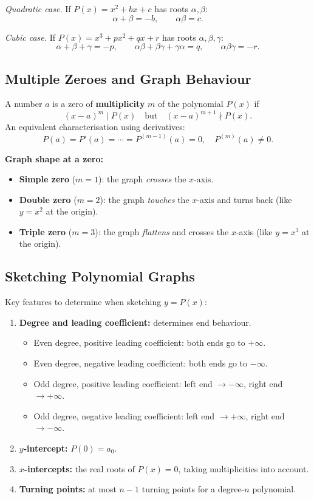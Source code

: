 \documentclass[12pt]{article}
\begin{document}
\textit{Quadratic case.} If $P(x) = x^2 + bx + c$ has roots $\alpha, \beta$:
\[
  \alpha + \beta = -b, \qquad \alpha\beta = c.
\]

\textit{Cubic case.} If $P(x) = x^3 + px^2 + qx + r$ has roots $\alpha, \beta, \gamma$:
\[
  \alpha+\beta+\gamma = -p, \qquad
  \alpha\beta+\beta\gamma+\gamma\alpha = q, \qquad
  \alpha\beta\gamma = -r.
\]

\subsection{Multiple Zeroes and Graph Behaviour}

A number $a$ is a zero of \textbf{multiplicity} $m$ of the polynomial $P(x)$ if
\[
  (x-a)^m \mid P(x) \quad\text{but}\quad (x-a)^{m+1} \nmid P(x).
\]
An equivalent characterisation using derivatives:
\[
  P(a) = P'(a) = \cdots = P^{(m-1)}(a) = 0, \quad P^{(m)}(a) \neq 0.
\]

\textbf{Graph shape at a zero:}
\begin{itemize}[leftmargin=*]
  \item \textbf{Simple zero} ($m = 1$): the graph \emph{crosses} the $x$-axis.
  \item \textbf{Double zero} ($m = 2$): the graph \emph{touches} the $x$-axis and turns back (like $y = x^2$ at the origin).
  \item \textbf{Triple zero} ($m = 3$): the graph \emph{flattens} and crosses the $x$-axis (like $y = x^3$ at the origin).
\end{itemize}

\subsection{Sketching Polynomial Graphs}

Key features to determine when sketching $y = P(x)$:
\begin{enumerate}[leftmargin=*]
  \item \textbf{Degree and leading coefficient:} determines end behaviour.
  \begin{itemize}[leftmargin=*]
    \item Even degree, positive leading coefficient: both ends go to $+\infty$.
    \item Even degree, negative leading coefficient: both ends go to $-\infty$.
    \item Odd degree, positive leading coefficient: left end $\to -\infty$, right end $\to +\infty$.
    \item Odd degree, negative leading coefficient: left end $\to +\infty$, right end $\to -\infty$.
  \end{itemize}
  \item \textbf{$y$-intercept:} $P(0) = a_0$.
  \item \textbf{$x$-intercepts:} the real roots of $P(x) = 0$, taking multiplicities into account.
  \item \textbf{Turning points:} at most $n-1$ turning points for a degree-$n$ polynomial.
\end{enumerate}
\end{document}
